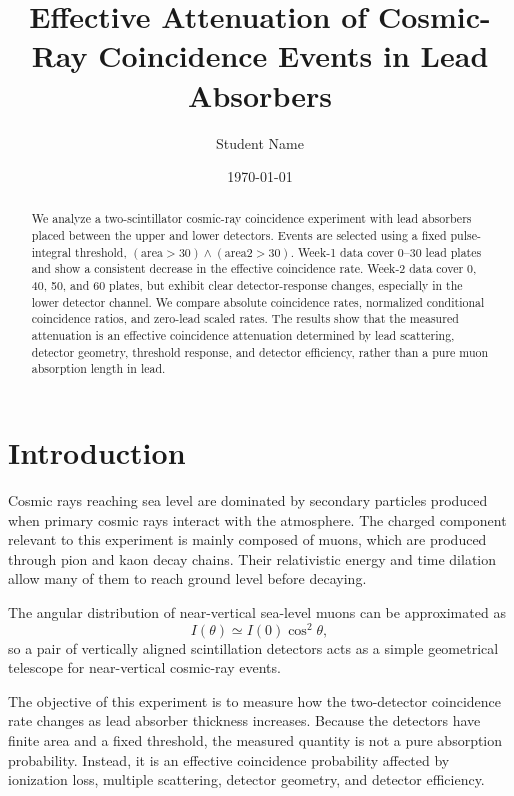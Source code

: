\documentclass[aps,prl,twocolumn,superscriptaddress,nofootinbib]{revtex4-2}
\begin{document}
\title{Effective Attenuation of Cosmic-Ray Coincidence Events in Lead Absorbers}

\author{Student Name}

\date{\today}

\begin{abstract}
We analyze a two-scintillator cosmic-ray coincidence experiment with lead absorbers placed between the upper and lower detectors. Events are selected using a fixed pulse-integral threshold, $(\mathrm{area}>30)\land(\mathrm{area2}>30)$. Week-1 data cover 0--30 lead plates and show a consistent decrease in the effective coincidence rate. Week-2 data cover 0, 40, 50, and 60 plates, but exhibit clear detector-response changes, especially in the lower detector channel. We compare absolute coincidence rates, normalized conditional coincidence ratios, and zero-lead scaled rates. The results show that the measured attenuation is an effective coincidence attenuation determined by lead scattering, detector geometry, threshold response, and detector efficiency, rather than a pure muon absorption length in lead.
\end{abstract}

\maketitle

\section{Introduction}

Cosmic rays reaching sea level are dominated by secondary particles produced when primary cosmic rays interact with the atmosphere. The charged component relevant to this experiment is mainly composed of muons, which are produced through pion and kaon decay chains. Their relativistic energy and time dilation allow many of them to reach ground level before decaying.

The angular distribution of near-vertical sea-level muons can be approximated as
\begin{equation}
I(\theta) \simeq I(0)\cos^2\theta,
\end{equation}
so a pair of vertically aligned scintillation detectors acts as a simple geometrical telescope for near-vertical cosmic-ray events.

The objective of this experiment is to measure how the two-detector coincidence rate changes as lead absorber thickness increases. Because the detectors have finite area and a fixed threshold, the measured quantity is not a pure absorption probability. Instead, it is an effective coincidence probability affected by ionization loss, multiple scattering, detector geometry, and detector efficiency.
\end{document}
